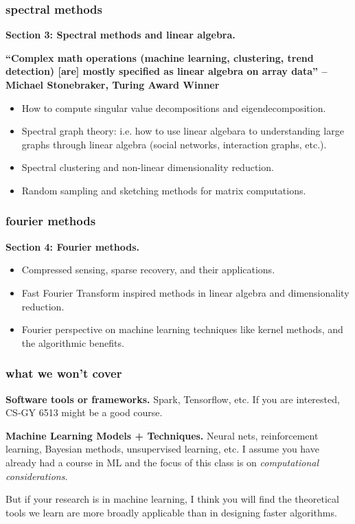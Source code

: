 \documentclass[]{beamer}
\begin{document}
	\begin{frame}
		\frametitle{spectral methods}
		\small
		
		\textbf{Section 3: Spectral methods and linear algebra.}
		
		\alert{\textbf{``Complex math operations (machine learning, clustering, trend detection) [are] mostly specified as linear algebra on array data'' -- Michael Stonebraker, Turing Award Winner}}
		
		\begin{itemize}
			\item How to compute singular value decompositions and eigendecomposition.
			\item Spectral graph theory: i.e. how to use linear algebara to understanding large graphs through linear algebra (social networks, interaction graphs, etc.). 
			\item Spectral clustering and non-linear dimensionality reduction.
			\item Random sampling and sketching methods for matrix computations.
		\end{itemize}
	\end{frame}
	
	\begin{frame}
		\frametitle{fourier methods}
		\small
		\textbf{Section 4: Fourier methods.}
		\begin{itemize}
			\item Compressed sensing, sparse recovery, and their applications.
			\item Fast Fourier Transform inspired methods in linear algebra and dimensionality reduction.
			\item Fourier perspective on machine learning techniques like kernel methods, and the algorithmic benefits.
		\end{itemize}
	\end{frame}
	
	\begin{frame}
		\frametitle{what we won't cover}
		
		\textbf{Software tools or frameworks.} Spark, Tensorflow, etc.  If you are interested, CS-GY 6513 might be a good course.
		\vspace{1em}
		
		\textbf{Machine Learning Models + Techniques.} Neural nets, reinforcement learning, Bayesian methods, unsupervised learning, etc. I assume you have already had a course in ML and the focus of this class is on \emph{computational considerations}.
		
		\begin{center}
			But if your research is in machine learning, I think you will find the theoretical tools we learn are more broadly applicable than in designing faster algorithms. 
		\end{center}
		
	\end{frame}
	
\end{document}

